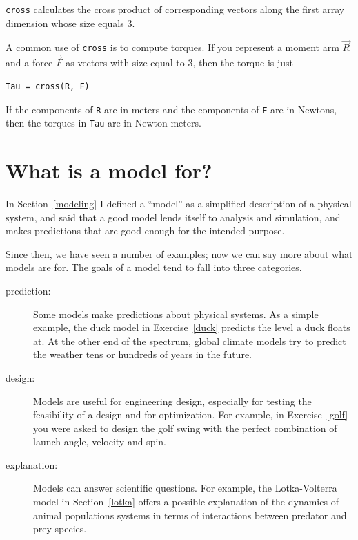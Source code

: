 \documentclass{book}
\begin{document}
{\tt cross} calculates the cross product of corresponding vectors along
the first array dimension whose size equals 3.

A common use of {\tt cross} is to compute torques.  If you represent
a moment arm $\vec{R}$ and a force $\vec{F}$ as vectors with size equal
to 3, then the torque is just

\begin{verbatim}
Tau = cross(R, F)
\end{verbatim}

If the components of {\tt R} are in meters and the components
of {\tt F} are in Newtons, then the torques in {\tt Tau} are
in Newton-meters.




\section{What is a model for?}

In Section~\ref{modeling} I defined a ``model'' as a simplified
description of a physical system, and said that a good model
lends itself to analysis and simulation, and makes predictions
that are good enough for the intended purpose.

Since then, we have seen a number of examples; now we can
say more about what models are for.  The goals of a model tend
to fall into three categories.

\begin{description}

\item[prediction:] Some models make predictions about physical
systems.  As a simple example, the duck model in
Exercise~\ref{duck} predicts the level a duck floats at.  At the other
end of the spectrum, global climate models try to predict the weather
tens or hundreds of years in the future.

\item[design:] Models are useful for engineering design, especially
for testing the feasibility of a design and for optimization.  For
example, in Exercise~\ref{golf} you were asked to design the golf
swing with the perfect combination of launch angle, velocity and spin.

\item[explanation:] Models can answer scientific questions.  For
example, the Lotka-Volterra model in Section~\ref{lotka} offers a
possible explanation of the dynamics of animal populations systems in
terms of interactions between predator and prey species.

\end{description}
\end{document}
